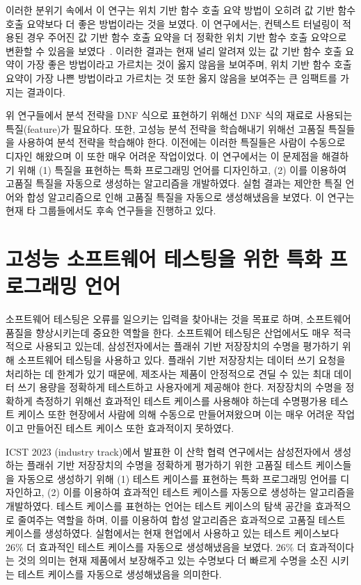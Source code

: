 \documentclass[11pt]{article}
\newcommand{\myparagraph}[1]{\medskip\noindent{\it \textbf{#1.}}}
\begin{document}
\begin{spacing}{1.145}
이러한 분위기 속에서 이 연구는 위치 기반 함수 호출 요약 방법이 오히려 값 기반 함수 호출 요약보다 더 좋은 방법이라는 것을 보였다.
%
이 연구에서는, 컨텍스트 터널링이 적용된 경우 주어진 값 기반 함수 호출 요약을 더 정확한 위치 기반 함수 호출 요약으로 변환할 수 있음을 보였다~\cite{JeOh22}.
%
이러한 결과는 현재 널리 알려져 있는 값 기반 함수 호출 요약이 가장 좋은 방법이라고 가르치는 것이 옳지 않음을 보여주며, 위치 기반 함수 호출 요약이 가장 나쁜 방법이라고 가르치는 것 또한 옳지 않음을 보여주는 큰 임팩트를 가지는 결과이다.


\myparagraph{특질 자동 생성을 위한 특질 언어 및 합성 알고리즘~\cite{Jeon20}}
위 연구들에서 분석 전략을 DNF 식으로 표현하기 위해선 DNF 식의 재료로 사용되는 특질(feature)가 필요하다.
%
또한, 고성능 분석 전략을 학습해내기 위해선 고품질 특질들을 사용하여 분석 전략을 학습해야 한다.
%
이전에는 이러한 특질들은 사람이 수동으로 디자인 해왔으며 이 또한 매우 어려운 작업이었다.
%
이 연구에서는 이 문제점을 해결하기 위해 (1) 특질을 표현하는 특화 프로그래밍 언어를 디자인하고, (2) 이를 이용하여 고품질 특질을 자동으로 생성하는 알고리즘을 개발하였다.
%
실험 결과는 제안한 특질 언어와 합성 알고리즘으로 인해 고품질 특질을 자동으로 생성해냈음을 보였다.
%
이 연구는 현재 타 그룹들에서도 후속 연구들을 진행하고 있다.



\section{고성능 소프트웨어 테스팅을 위한 특화 프로그래밍 언어}
%
소프트웨어 테스팅은 오류를 일으키는 입력을 찾아내는 것을 목표로 하며, 소프트웨어 품질을 향상시키는데 중요한 역할을 한다.
%
소프트웨어 테스팅은 산업에서도 매우 적극적으로 사용되고 있는데, 삼성전자에서는 플래쉬 기반 저장장치의 수명을 평가하기 위해 소프트웨어 테스팅을 사용하고 있다.
%
플래쉬 기반 저장장치는 데이터 쓰기 요청을 처리하는 데 한계가 있기 때문에, 제조사는 제품이 안정적으로 견딜 수 있는 최대 데이터 쓰기 용량을 정확하게 테스트하고 사용자에게 제공해야 한다.
%
저장장치의 수명을 정확하게 측정하기 위해선 효과적인 테스트 케이스를 사용해야 하는데 수명평가용 테스트 케이스 또한 현장에서 사람에 의해 수동으로 만들어져왔으며 이는 매우 어려운 작업이고 만들어진 테스트 케이스 또한 효과적이지 못하였다.


ICST 2023 (industry track)에서 발표한 이 산학 협력 연구에서는 삼성전자에서 생성하는 플래쉬 기반 저장장치의 수명을 정확하게 평가하기 위한 고품질 테스트 케이스들을 자동으로 생성하기 위해 (1) 테스트 케이스를 표현하는 특화 프로그래밍 언어를 디자인하고, (2) 이를 이용하여 효과적인 테스트 케이스를 자동으로 생성하는 알고리즘을 개발하였다.
%
테스트 케이스를 표현하는 언어는 테스트 케이스의 탐색 공간을 효과적으로 줄여주는 역할을 하며, 이를 이용하여 합성 알고리즘은 효과적으로 고품질 테스트 케이스를 생성하였다.
%
실험에서는 현재 현업에서 사용하고 있는 테스트 케이스보다 26\% 더 효과적인 테스트 케이스를 자동으로 생성해냈음을 보였다.
%
26\% 더 효과적이다는 것의 의미는 현재 제품에서 보장해주고 있는 수명보다 더 빠르게 수명을 소진 시키는 테스트 케이스를 자동으로 생성해냈음을 의미한다.






\end{spacing}
\end{document}
